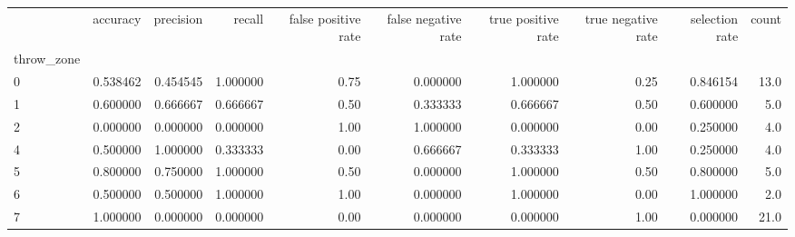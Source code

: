 \begin{tabular}{lrrrrrrrrr}
\toprule
{} &  accuracy &  precision &    recall &  false positive rate &  false negative rate &  true positive rate &  true negative rate &  selection rate &  count \\
throw\_zone &           &            &           &                      &                      &                     &                     &                 &        \\
\midrule
0          &  0.538462 &   0.454545 &  1.000000 &                 0.75 &             0.000000 &            1.000000 &                0.25 &        0.846154 &   13.0 \\
1          &  0.600000 &   0.666667 &  0.666667 &                 0.50 &             0.333333 &            0.666667 &                0.50 &        0.600000 &    5.0 \\
2          &  0.000000 &   0.000000 &  0.000000 &                 1.00 &             1.000000 &            0.000000 &                0.00 &        0.250000 &    4.0 \\
4          &  0.500000 &   1.000000 &  0.333333 &                 0.00 &             0.666667 &            0.333333 &                1.00 &        0.250000 &    4.0 \\
5          &  0.800000 &   0.750000 &  1.000000 &                 0.50 &             0.000000 &            1.000000 &                0.50 &        0.800000 &    5.0 \\
6          &  0.500000 &   0.500000 &  1.000000 &                 1.00 &             0.000000 &            1.000000 &                0.00 &        1.000000 &    2.0 \\
7          &  1.000000 &   0.000000 &  0.000000 &                 0.00 &             0.000000 &            0.000000 &                1.00 &        0.000000 &   21.0 \\
\bottomrule
\end{tabular}
